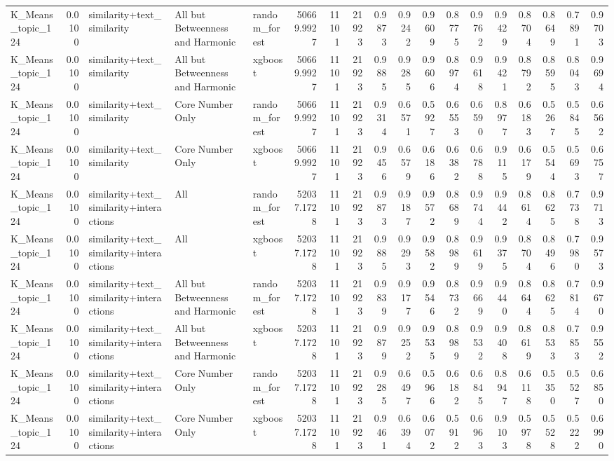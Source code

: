 \begin{tabular}{lrlllrrrrrrrrrrrrr}
K_Means_topic_124 & 0.0100 & similarity+text_similarity & All but Betweenness and Harmonic & random_forest & 50669.9927 & 11101 & 21923 & 0.9873 & 0.9242 & 0.9609 & 0.8775 & 0.9762 & 0.9429 & 0.8704 & 0.8649 & 0.7891 & 0.9703 \\
K_Means_topic_124 & 0.0100 & similarity+text_similarity & All but Betweenness and Harmonic & xgboost & 50669.9927 & 11101 & 21923 & 0.9885 & 0.9285 & 0.9606 & 0.8974 & 0.9618 & 0.9421 & 0.8792 & 0.8595 & 0.8043 & 0.9694 \\
K_Means_topic_124 & 0.0100 & similarity+text_similarity & Core Number Only & random_forest & 50669.9927 & 11101 & 21923 & 0.9314 & 0.6571 & 0.5927 & 0.6553 & 0.6590 & 0.8977 & 0.6183 & 0.5267 & 0.5845 & 0.6562 \\
K_Means_topic_124 & 0.0100 & similarity+text_similarity & Core Number Only & xgboost & 50669.9927 & 11101 & 21923 & 0.9456 & 0.6579 & 0.6186 & 0.6382 & 0.6788 & 0.9115 & 0.6179 & 0.5544 & 0.5693 & 0.6757 \\
K_Means_topic_124 & 0.0100 & similarity+text_similarity+interactions & All & random_forest & 52037.1728 & 11101 & 21923 & 0.9873 & 0.9187 & 0.9572 & 0.8689 & 0.9744 & 0.9442 & 0.8614 & 0.8625 & 0.7738 & 0.9713 \\
K_Means_topic_124 & 0.0100 & similarity+text_similarity+interactions & All & xgboost & 52037.1728 & 11101 & 21923 & 0.9885 & 0.9293 & 0.9582 & 0.8989 & 0.9619 & 0.9375 & 0.8704 & 0.8496 & 0.7980 & 0.9573 \\
K_Means_topic_124 & 0.0100 & similarity+text_similarity+interactions & All but Betweenness and Harmonic & random_forest & 52037.1728 & 11101 & 21923 & 0.9839 & 0.9177 & 0.9546 & 0.8732 & 0.9669 & 0.9440 & 0.8644 & 0.8625 & 0.7814 & 0.9670 \\
K_Means_topic_124 & 0.0100 & similarity+text_similarity+interactions & All but Betweenness and Harmonic & xgboost & 52037.1728 & 11101 & 21923 & 0.9879 & 0.9252 & 0.9535 & 0.8989 & 0.9532 & 0.9408 & 0.8619 & 0.8533 & 0.7853 & 0.9552 \\
K_Means_topic_124 & 0.0100 & similarity+text_similarity+interactions & Core Number Only & random_forest & 52037.1728 & 11101 & 21923 & 0.9285 & 0.6497 & 0.5966 & 0.6182 & 0.6845 & 0.8947 & 0.6118 & 0.5350 & 0.5527 & 0.6850 \\
K_Means_topic_124 & 0.0100 & similarity+text_similarity+interactions & Core Number Only & xgboost & 52037.1728 & 11101 & 21923 & 0.9461 & 0.6394 & 0.6072 & 0.5912 & 0.6963 & 0.9103 & 0.5978 & 0.5528 & 0.5222 & 0.6990 \\

\end{tabular}
